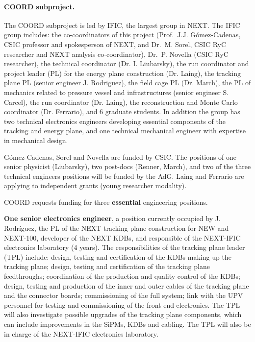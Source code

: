 \paragraph{COORD subproject.}

The COORD subproject is led by IFIC, the largest group in NEXT. The IFIC group includes: the co-coordinators of this project (Prof.~J.J. G\'omez-Cadenas, CSIC professor and spokesperson of NEXT, and Dr.~M. Sorel, CSIC RyC researcher and NEXT analysis co-coordinator), Dr.~P. Novella (CSIC RyC researcher), the technical coordinator (Dr. I. Liubarsky), the run coordinator and project leader (PL) for the energy plane construction (Dr. Laing), the tracking plane PL (senior engineer J. Rodriguez), the field cage PL (Dr. March), the PL of mechanics related to pressure vessel and infrastructures (senior engineer S. Carcel), the run coordinator (Dr. Laing), the reconstruction and Monte Carlo coordinator (Dr. Ferrario), and 6 graduate students. In addition the group has two technical electronics engineers developing essential components of the tracking and energy plane, and one technical mechanical engineer with expertise in mechanical design. 

G\'omez-Cadenas, Sorel and Novella are funded by CSIC. The positions of one senior physicist (Liubarsky), two post-docs (Renner, March), and two of the three technical engineers positions will be funded by the AdG. Laing and Ferrario are applying to independent grants (young researcher modality). 

COORD requests funding for three {\bf essential} engineering positions. 

{\bf One senior electronics engineer}, a position currently occupied by J. Rodríguez, the PL of the NEXT tracking plane construction for NEW and NEXT-100, developer of the NEXT KDBs, and responsible of the NEXT-IFIC electronics laboratory (4 years). The responsibilities of the tracking plane leader (TPL) include: design, testing and certification of the KDBs making up the tracking plane; design, testing and certification of the tracking plane feedthroughs; coordination of the production and quality control of the KDBs; design, testing and production of the inner and outer cables of the tracking plane and the connector boards; commissioning of the full system; link with the UPV personnel for testing and commissioning of the front-end electronics. The TPL will also investigate possible upgrades of the tracking plane components, which can include improvements in the SiPMs, KDBs and cabling. The TPL will also be in charge of the NEXT-IFIC electronics laboratory. 

